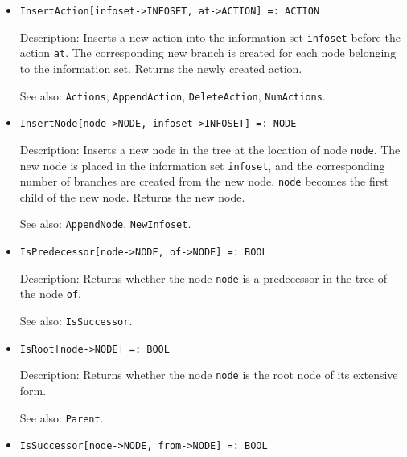 \begin{itemize}
\item
\protect \large \begin{verbatim}
InsertAction[infoset->INFOSET, at->ACTION] =: ACTION
\end{verbatim}\normalsize

\bd
\item
[Description:] Inserts a new action into the information set \verb+infoset+
before the action \verb+at+.  The corresponding new branch is created for
each node belonging to the information set.  Returns the newly created action.
\item
[See also:] {\tt Actions}, {\tt AppendAction}, {\tt DeleteAction},
{\tt NumActions}.
\ed

\item
\protect \large \begin{verbatim}
InsertNode[node->NODE, infoset->INFOSET] =: NODE
\end{verbatim}\normalsize

\bd
\item
[Description:] Inserts a new node in the tree at the location of
node \verb+node+.  The
new node is placed in the information set \verb+infoset+, and the
corresponding number of branches are created from the new node.  \verb+node+
becomes the first child of the new node.  Returns the new node.
\item
[See also:] {\tt AppendNode}, {\tt NewInfoset}.
\ed

\item
\protect \large \begin{verbatim}
IsPredecessor[node->NODE, of->NODE] =: BOOL
\end{verbatim}\normalsize

\bd
\item
[Description:] Returns whether the node \verb+node+ is a predecessor
in the tree of the node \verb+of+.
\item
[See also:] {\tt IsSuccessor}.
\ed

\item
\protect \large \begin{verbatim}
IsRoot[node->NODE] =: BOOL
\end{verbatim}\normalsize

\bd
\item
[Description:] Returns whether the node \verb+node+ is the root node of its
extensive form.
\item
[See also:] {\tt Parent}.
\ed

\item
\protect \large \begin{verbatim}
IsSuccessor[node->NODE, from->NODE] =: BOOL
\end{verbatim}\normalsize


\end{itemize}
